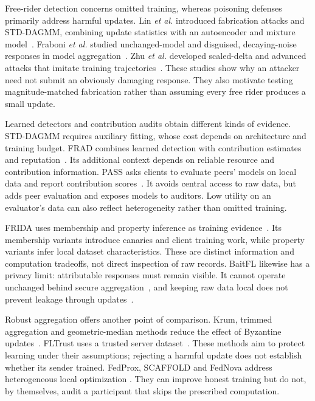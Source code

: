 \documentclass[journal]{IEEEtran}
\makeatletter
\renewcommand{\section}{\@startsection{section}{1}{\z@}{1.5ex}{0.7ex}{\normalfont\normalsize\centering\scshape}}
\makeatother
\begin{document}
\section{Literature Review}\label{sec:related}
Free-rider detection concerns omitted training, whereas poisoning
defenses primarily address harmful updates. Lin \emph{et al.} introduced
fabrication attacks and STD-DAGMM, combining update statistics with an
autoencoder and mixture model~\cite{lin2019freeriders,zong2018dagmm}.
Fraboni \emph{et al.} studied unchanged-model and disguised, decaying-noise
responses in model aggregation~\cite{fraboni2021freerider}. Zhu \emph{et al.}
developed scaled-delta and advanced attacks that imitate training
trajectories~\cite{zhu2021advanced}. These studies show why an attacker
need not submit an obviously damaging response. They also motivate
testing magnitude-matched fabrication rather than assuming every free
rider produces a small update.

Learned detectors and contribution audits obtain different kinds of
evidence. STD-DAGMM requires auxiliary fitting, whose cost depends on
architecture and training budget. FRAD combines learned detection with
contribution estimates and reputation~\cite{wang2024frad}. Its additional
context depends on reliable resource and contribution information.
PASS asks clients to evaluate peers' models on local data and report
contribution scores~\cite{wang2024pass}. It avoids central access to raw
data, but adds peer evaluation and exposes models to auditors. Low
utility on an evaluator's data can also reflect heterogeneity rather
than omitted training.

FRIDA uses membership and property inference as training
evidence~\cite{recasens2026frida}. Its membership variants introduce
canaries and client training work, while property variants infer local
dataset characteristics. These are distinct information and computation
tradeoffs, not direct inspection of raw records. BaitFL likewise has a
privacy limit: attributable responses must remain visible. It cannot
operate unchanged behind secure aggregation~\cite{bonawitz2017practical},
and keeping raw data local does not prevent leakage through
updates~\cite{zhu2019leakage,melis2019leakage}.

Robust aggregation offers another point of comparison. Krum, trimmed
aggregation and geometric-median methods reduce the effect of Byzantine
updates~\cite{blanchard2017krum,yin2018byzantine,pillutla2022rfa}.
FLTrust uses a trusted server dataset~\cite{cao2021fltrust}. These methods
aim to protect learning under their assumptions; rejecting a harmful
update does not establish whether its sender trained. FedProx, SCAFFOLD
and FedNova address heterogeneous local optimization
\cite{li2020fedprox,karimireddy2020scaffold,wang2020fednova}. They can
improve honest training but do not, by themselves, audit a participant
that skips the prescribed computation.
\end{document}
